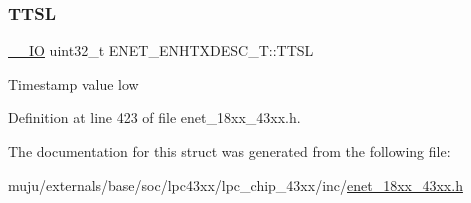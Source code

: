\mbox{\label{struct_e_n_e_t___e_n_h_t_x_d_e_s_c___t_ad37c5852ed8a2168db4f2f0962d5213c}} 
\subsubsection{\texorpdfstring{T\+T\+SL}{TTSL}}
{\footnotesize\ttfamily \hyperlink{core__sc300_8h_aec43007d9998a0a0e01faede4133d6be}{\+\_\+\+\_\+\+IO} uint32\+\_\+t E\+N\+E\+T\+\_\+\+E\+N\+H\+T\+X\+D\+E\+S\+C\+\_\+\+T\+::\+T\+T\+SL}

Timestamp value low 

Definition at line 423 of file enet\+\_\+18xx\+\_\+43xx.\+h.



The documentation for this struct was generated from the following file\+:\begin{DoxyCompactItemize}
\item 
muju/externals/base/soc/lpc43xx/lpc\+\_\+chip\+\_\+43xx/inc/\hyperlink{enet__18xx__43xx_8h}{enet\+\_\+18xx\+\_\+43xx.\+h}\end{DoxyCompactItemize}

